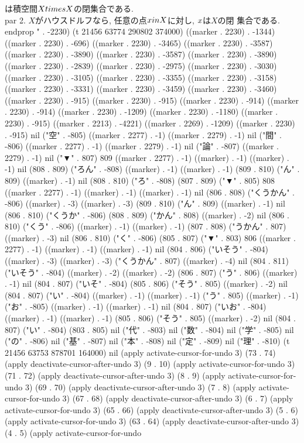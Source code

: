  は積空間$X\\times X$の閉集合である.
 \\par 2. $X$がハウスドルフなら, 任意の点$x\\in X$に対し, $\\{x\\}$は$X$の閉
 集合である.
\\end{prop}
" . -2230) (t 21456 63774 290802 374000) ((marker . 2230) . -1344) ((marker . 2230) . -696) ((marker . 2230) . -3465) ((marker . 2230) . -3587) ((marker . 2230) . -3890) ((marker . 2230) . -3587) ((marker . 2230) . -3890) ((marker . 2230) . -2839) ((marker . 2230) . -2975) ((marker . 2230) . -3030) ((marker . 2230) . -3105) ((marker . 2230) . -3355) ((marker . 2230) . -3158) ((marker . 2230) . -3331) ((marker . 2230) . -3459) ((marker . 2230) . -3460) ((marker . 2230) . -915) ((marker . 2230) . -915) ((marker . 2230) . -914) ((marker . 2230) . -914) ((marker . 2230) . -1209) ((marker . 2230) . -1180) ((marker . 2230) . -915) ((marker . 2213) . -4221) ((marker . 2269) . -1209) ((marker . 2230) . -915) nil ("空" . -805) ((marker . 2277) . -1) ((marker . 2279) . -1) nil ("間" . -806) ((marker . 2277) . -1) ((marker . 2279) . -1) nil ("論" . -807) ((marker . 2279) . -1) nil ("▼" . 807) 809 ((marker . 2277) . -1) ((marker) . -1) ((marker) . -1) nil (808 . 809) ("ろん" . -808) ((marker) . -1) ((marker) . -1) (809 . 810) ("ん" . 809) ((marker) . -1) nil (808 . 810) ("ろ" . -808) (807 . 809) ("▼" . 805) 808 ((marker . 2277) . -1) ((marker) . -1) ((marker) . -1) nil (806 . 808) ("くうかん" . -806) ((marker) . -3) ((marker) . -3) (809 . 810) ("ん" . 809) ((marker) . -1) nil (806 . 810) ("くうか" . -806) (808 . 809) ("かん" . 808) ((marker) . -2) nil (806 . 810) ("くう" . -806) ((marker) . -1) ((marker) . -1) (807 . 808) ("うかん" . 807) ((marker) . -3) nil (806 . 810) ("く" . -806) (805 . 807) ("▼" . 803) 806 ((marker . 2277) . -1) ((marker) . -1) ((marker) . -1) nil (804 . 806) ("いそう" . -804) ((marker) . -3) ((marker) . -3) ("くうかん" . 807) ((marker) . -4) nil (804 . 811) ("いそう" . -804) ((marker) . -2) ((marker) . -2) (806 . 807) ("う" . 806) ((marker) . -1) nil (804 . 807) ("いそ" . -804) (805 . 806) ("そう" . 805) ((marker) . -2) nil (804 . 807) ("い" . -804) ((marker) . -1) ((marker) . -1) ("う" . 805) ((marker) . -1) ("お" . -805) ((marker) . -1) ((marker) . -1) nil (804 . 807) ("いお" . -804) ((marker) . -1) ((marker) . -1) (805 . 806) ("そう" . 805) ((marker) . -2) nil (804 . 807) ("い" . -804) (803 . 805) nil ("代" . -803) nil ("数" . -804) nil ("学" . -805) nil ("の" . -806) nil ("基" . -807) nil ("本" . -808) nil ("定" . -809) nil ("理" . -810) (t 21456 63753 878701 164000) nil (apply activate-cursor-for-undo 3) (73 . 74) (apply deactivate-cursor-after-undo 3) (9 . 10) (apply activate-cursor-for-undo 3) (71 . 72) (apply deactivate-cursor-after-undo 3) (8 . 9) (apply activate-cursor-for-undo 3) (69 . 70) (apply deactivate-cursor-after-undo 3) (7 . 8) (apply activate-cursor-for-undo 3) (67 . 68) (apply deactivate-cursor-after-undo 3) (6 . 7) (apply activate-cursor-for-undo 3) (65 . 66) (apply deactivate-cursor-after-undo 3) (5 . 6) (apply activate-cursor-for-undo 3) (63 . 64) (apply deactivate-cursor-after-undo 3) (4 . 5) (apply activate-cursor-for-undo 